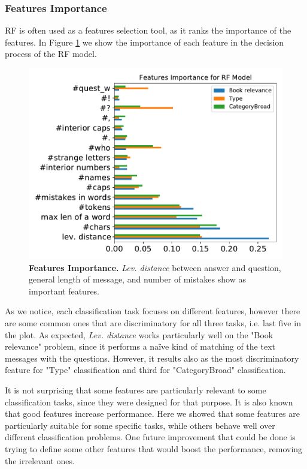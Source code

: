 \documentclass[11pt,a4paper]{article}
\begin{document}
\subsubsection{Features Importance}
RF is often used as a features selection tool, as it ranks the importance of the features. In Figure \ref{fig:ft_imp_RF} we show the importance of each feature in the decision process of the RF model.

\begin{figure}[tbh]
    \centering
    \includegraphics[width = \linewidth]{../results/features_imp_RF_plot.pdf}
    \caption{\textbf{Features Importance.} \textit{Lev. distance} between answer and question, general length of message, and number of mistakes show as important features.}
    \label{fig:ft_imp_RF}
\end{figure}

As we notice, each classification task focuses on different features, however there are some common ones that are discriminatory for all three tasks, i.e. last five in the plot. As expected, \textit{Lev. distance} works particularly well on the "Book relevance" problem, since it performs a naïve kind of matching of the text messages with the questions. However, it results also as the most discriminatory feature for "Type" classification and third for "CategoryBroad" classification.

It is not surprising that some features are particularly relevant to some classification tasks, since they were designed for that purpose. It is also known that good features increase performance. Here we showed that some features are particularly suitable for some specific tasks, while others behave well over different classification problems. One future improvement that could be done is trying to define some other features that would boost the performance, removing the irrelevant ones.
\end{document}
